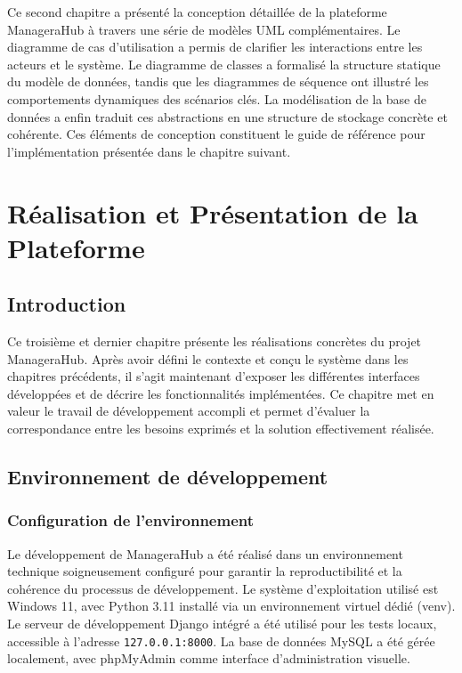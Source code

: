 \documentclass[12pt,a4paper]{report}
\begin{document}
Ce second chapitre a présenté la conception détaillée de la plateforme ManageraHub à travers une série de modèles UML complémentaires. Le diagramme de cas d'utilisation a permis de clarifier les interactions entre les acteurs et le système. Le diagramme de classes a formalisé la structure statique du modèle de données, tandis que les diagrammes de séquence ont illustré les comportements dynamiques des scénarios clés. La modélisation de la base de données a enfin traduit ces abstractions en une structure de stockage concrète et cohérente. Ces éléments de conception constituent le guide de référence pour l'implémentation présentée dans le chapitre suivant.

\chapter{Réalisation et Présentation de la Plateforme}

\section*{Introduction}

Ce troisième et dernier chapitre présente les réalisations concrètes du projet ManageraHub. Après avoir défini le contexte et conçu le système dans les chapitres précédents, il s'agit maintenant d'exposer les différentes interfaces développées et de décrire les fonctionnalités implémentées. Ce chapitre met en valeur le travail de développement accompli et permet d'évaluer la correspondance entre les besoins exprimés et la solution effectivement réalisée.

\section{Environnement de développement}

\subsection{Configuration de l'environnement}

Le développement de ManageraHub a été réalisé dans un environnement technique soigneusement configuré pour garantir la reproductibilité et la cohérence du processus de développement. Le système d'exploitation utilisé est Windows 11, avec Python 3.11 installé via un environnement virtuel dédié (venv). Le serveur de développement Django intégré a été utilisé pour les tests locaux, accessible à l'adresse \texttt{127.0.0.1:8000}. La base de données MySQL a été gérée localement, avec phpMyAdmin comme interface d'administration visuelle.
\end{document}
